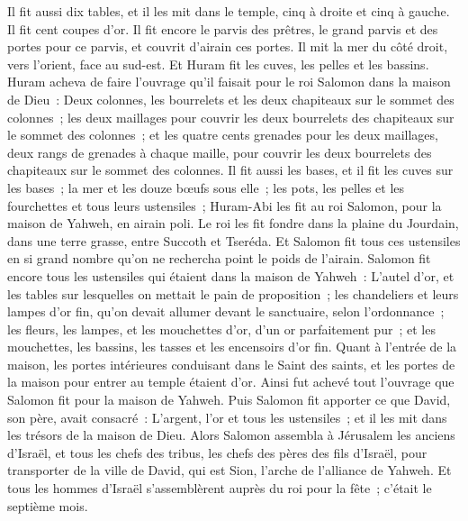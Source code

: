 \begin{multicols}{2}
Il fit aussi dix tables, et il les mit dans le temple, cinq à droite et cinq à gauche. Il fit cent coupes d'or.
Il fit encore le parvis des prêtres, le grand parvis et des portes pour ce parvis, et couvrit d'airain ces portes.
Il mit la mer du côté droit, vers l'orient, face au sud-est.
Et Huram fit les cuves, les pelles et les bassins. Huram acheva de faire l'ouvrage qu'il faisait pour le roi Salomon dans la maison de Dieu~:
Deux colonnes, les bourrelets et les deux chapiteaux sur le sommet des colonnes~; les deux maillages pour couvrir les deux bourrelets des chapiteaux sur le sommet des colonnes~;
et les quatre cents grenades pour les deux maillages, deux rangs de grenades à chaque maille, pour couvrir les deux bourrelets des chapiteaux sur le sommet des colonnes.
Il fit aussi les bases, et il fit les cuves sur les bases~;
la mer et les douze bœufs sous elle~;
les pots, les pelles et les fourchettes et tous leurs ustensiles~; Huram-Abi les fit au roi Salomon, pour la maison de Yahweh, en airain poli.
Le roi les fit fondre dans la plaine du Jourdain, dans une terre grasse, entre Succoth et Tseréda.
Et Salomon fit tous ces ustensiles en si grand nombre qu'on ne rechercha point le poids de l'airain.
Salomon fit encore tous les ustensiles qui étaient dans la maison de Yahweh~: L'autel d'or, et les tables sur lesquelles on mettait le pain de proposition~;
les chandeliers et leurs lampes d'or fin, qu'on devait allumer devant le sanctuaire, selon l'ordonnance~;
les fleurs, les lampes, et les mouchettes d'or, d'un or parfaitement pur~;
et les mouchettes, les bassins, les tasses et les encensoirs d'or fin. Quant à l'entrée de la maison, les portes intérieures conduisant dans le Saint des saints, et les portes de la maison pour entrer au temple étaient d'or.
\VerseOne{}Ainsi fut achevé tout l'ouvrage que Salomon fit pour la maison de Yahweh. Puis Salomon fit apporter ce que David, son père, avait consacré~: L'argent, l'or et tous les ustensiles~; et il les mit dans les trésors de la maison de Dieu.
Alors Salomon assembla à Jérusalem les anciens d'Israël, et tous les chefs des tribus, les chefs des pères des fils d'Israël, pour transporter de la ville de David, qui est Sion, l'arche de l'alliance de Yahweh.
Et tous les hommes d'Israël s'assemblèrent auprès du roi pour la fête~; c'était le septième mois.

\end{multicols}
